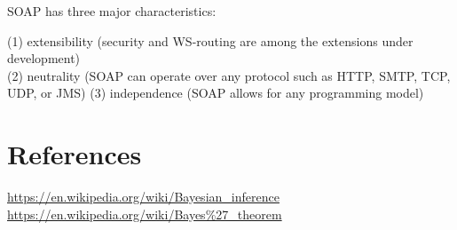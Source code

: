 \documentclass[11pt]{article}
\begin{document}
SOAP has three major characteristics:

(1) extensibility (security and WS-routing are among the extensions under development)\\
(2) neutrality (SOAP can operate over any protocol such as HTTP, SMTP, TCP, UDP, or JMS)
(3) independence (SOAP allows for any programming model)












\section{References}
\href{https://en.wikipedia.org/wiki/Bayesian\_inference}{https://en.wikipedia.org/wiki/Bayesian\_inference}\\
\href{hrefhttps://en.wikipedia.org/wiki/Bayes\%27\_theorem}{https://en.wikipedia.org/wiki/Bayes\%27\_theorem}\\

\citet{Croom04}



\end{document}
